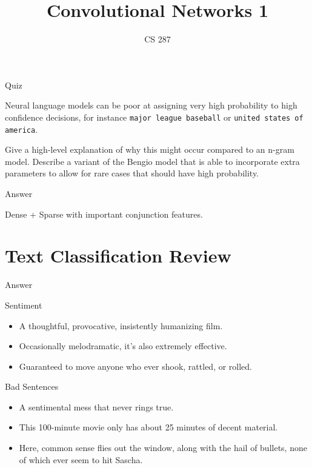 \documentclass{beamer}
\title{Convolutional Networks 1}
\date{}
\author{CS 287}
\begin{document}
\begin{frame}
  \titlepage
\end{frame}


\begin{frame}{Quiz}

Neural language models can be poor at assigning very high probability
to high confidence decisions, for instance \texttt{major league baseball}
or \texttt{united states of america}. 

\air 

Give a high-level explanation of why this might occur compared to an n-gram 
model. Describe a variant of the Bengio model that is able to incorporate extra parameters 
to allow for rare cases that should have high probability.  

\end{frame}

\begin{frame}{Answer}
  
 
  Dense + Sparse with important conjunction features. 

\end{frame}

\section{Text Classification Review}

\begin{frame}[allowframebreaks]{Answer}
\end{frame}

\begin{frame}{Sentiment}
  \begin{itemize}
  \item   A thoughtful, provocative, insistently humanizing film. 
  \item   Occasionally melodramatic, it's also extremely effective.
    \item   Guaranteed to move anyone who ever shook, rattled, or rolled.   
  \end{itemize}

  \alert{Bad Sentences}
  \begin{itemize}
  \item A sentimental mess that never rings true.  
  \item This 100-minute movie only has about 25 minutes of decent material.
  \item Here, common sense flies out the window, along with the hail of
    bullets, none of which ever seem to hit Sascha.
  \end{itemize}
\end{frame}
\end{document}
